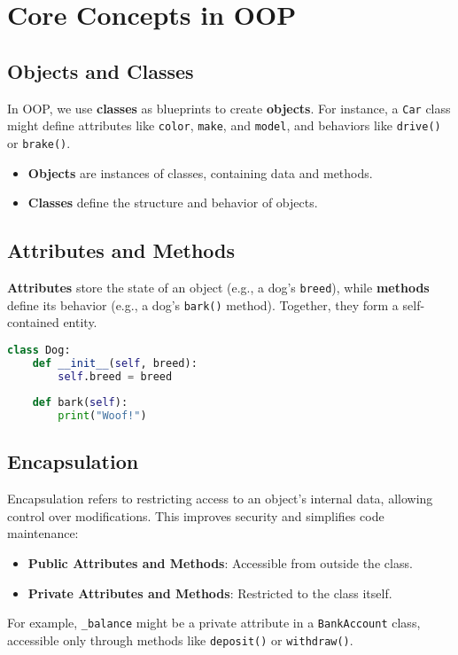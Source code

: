 \documentclass{article}
\begin{document}
\section{Core Concepts in OOP}
\subsection{Objects and Classes}
In OOP, we use \textbf{classes} as blueprints to create \textbf{objects}. For instance, a \texttt{Car} class might define attributes like \texttt{color}, \texttt{make}, and \texttt{model}, and behaviors like \texttt{drive()} or \texttt{brake()}.
\begin{itemize}
    \item \textbf{Objects} are instances of classes, containing data and methods.
    \item \textbf{Classes} define the structure and behavior of objects.
\end{itemize}

\subsection{Attributes and Methods}
\textbf{Attributes} store the state of an object (e.g., a dog’s \texttt{breed}), while \textbf{methods} define its behavior (e.g., a dog’s \texttt{bark()} method). Together, they form a self-contained entity.
\begin{lstlisting}[language=Python]
class Dog:
    def __init__(self, breed):
        self.breed = breed
    
    def bark(self):
        print("Woof!")
\end{lstlisting}

\subsection{Encapsulation}
Encapsulation refers to restricting access to an object’s internal data, allowing control over modifications. This improves security and simplifies code maintenance:
\begin{itemize}
    \item \textbf{Public Attributes and Methods}: Accessible from outside the class.
    \item \textbf{Private Attributes and Methods}: Restricted to the class itself.
\end{itemize}
For example, \texttt{\_balance} might be a private attribute in a \texttt{BankAccount} class, accessible only through methods like \texttt{deposit()} or \texttt{withdraw()}.
\end{document}
